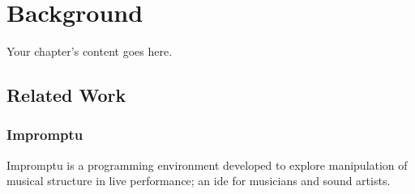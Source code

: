 
\chapter{Background}
\label{chapter:background}
Your chapter's content goes here.










\section{Related Work}


\subsection{Impromptu}
\label{section:impromptu:related}
Impromptu\cite{sorensen2005impromptu,sorensen2010programming} is a programming environment developed to explore manipulation of musical structure in live performance; an \gls{ide} for musicians and sound artists.


